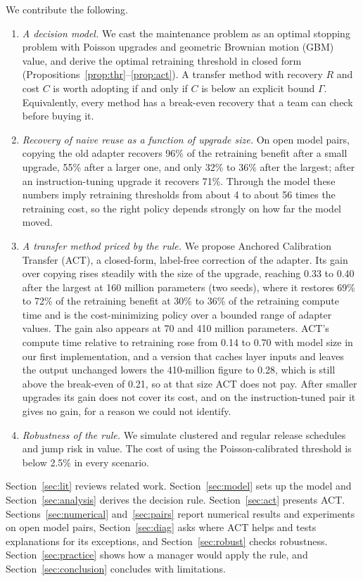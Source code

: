 \documentclass[preprint,12pt,authoryear]{elsarticle}
\begin{document}
We contribute the following.
\begin{enumerate}
\item \emph{A decision model.} We cast the maintenance problem as an optimal stopping problem with Poisson upgrades and geometric
Brownian motion (GBM) value, and derive the optimal retraining threshold in closed form (Propositions~\ref{prop:thr}--\ref{prop:act}).
A transfer method with recovery $R$ and cost $C$ is worth adopting if and only if $C$ is below an explicit bound $\Gamma$. Equivalently, every method has a
break-even recovery that a team can check before buying it.
\item \emph{Recovery of naive reuse as a function of upgrade size.} On open model pairs, copying the old adapter recovers 96\% of the retraining
benefit after a small upgrade, 55\% after a larger one, and only 32\% to 36\% after the largest; after an instruction-tuning upgrade it recovers 71\%. Through the model these numbers imply
retraining thresholds from about 4 to about 56 times the retraining cost, so the right policy depends strongly on how far the model moved.
\item \emph{A transfer method priced by the rule.} We propose Anchored Calibration Transfer (ACT), a closed-form, label-free correction of the adapter.
Its gain over copying rises steadily with the size of the upgrade, reaching 0.33 to 0.40 after the largest at 160 million parameters (two seeds), where it restores 69\% to 72\% of the retraining benefit at 30\% to 36\% of the retraining compute time and is the
cost-minimizing policy over a bounded range of adapter values. The gain also appears at 70 and 410 million parameters. ACT's compute time relative to retraining rose from 0.14 to 0.70 with model size in our first implementation, and a version that caches layer inputs and leaves the output unchanged lowers the 410-million figure to 0.28, which is still above the break-even of 0.21, so at that size ACT does not pay.
After smaller upgrades its gain does not cover its cost, and on the instruction-tuned pair it gives no gain, for a reason we could not identify.
\item \emph{Robustness of the rule.} We simulate clustered and regular release schedules and jump risk in value. The cost of using the
Poisson-calibrated threshold is below 2.5\% in every scenario.
\end{enumerate}

Section~\ref{sec:lit} reviews related work. Section~\ref{sec:model} sets up the model and Section~\ref{sec:analysis} derives the
decision rule. Section~\ref{sec:act} presents ACT. Sections~\ref{sec:numerical} and~\ref{sec:pairs} report numerical results and experiments on open
model pairs, Section~\ref{sec:diag} asks where ACT helps and tests explanations for its exceptions, and Section~\ref{sec:robust} checks robustness.
Section~\ref{sec:practice} shows how a manager would apply the rule, and Section~\ref{sec:conclusion} concludes with limitations.
\end{document}
